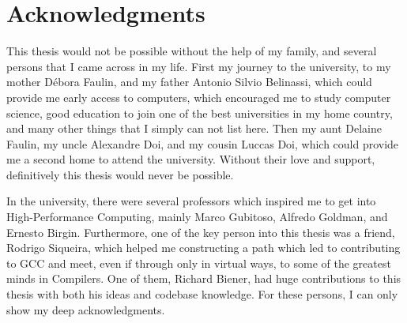 



\chapter*{Acknowledgments}

This thesis would not be possible without the help of my family, and several
persons that I came across in my life. First my journey to the university, to
my mother Débora Faulin, and my father Antonio Silvio Belinassi, which could
provide me early access to computers, which encouraged me to study computer
science, good education to join one of the best universities in my home
country, and many other things that I simply can not list here. Then my aunt
Delaine Faulin, my uncle Alexandre Doi, and my cousin Luccas Doi, which could
provide me a second home to attend the university.  Without their love and
support, definitively this thesis would never be possible.

In the university, there were several professors which inspired me to get into
High-Performance Computing, mainly Marco Gubitoso, Alfredo Goldman, and Ernesto
Birgin. Furthermore, one of the key person into this thesis was a friend,
Rodrigo Siqueira, which helped me constructing a path which led to contributing
to GCC and meet, even if through only in virtual ways, to some of the greatest
minds in Compilers. One of them, Richard Biener, had huge contributions to this
thesis with both his ideas and codebase knowledge. For these persons, I can
only show my deep acknowledgments.


